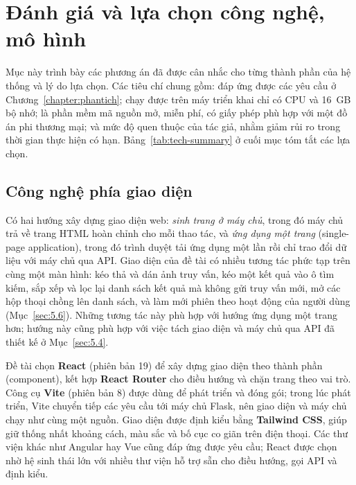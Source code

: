 \section{Đánh giá và lựa chọn công nghệ, mô hình}
\label{sec:6.1}

Mục này trình bày các phương án đã được cân nhắc cho từng thành phần của hệ thống và lý do lựa chọn. Các tiêu chí chung gồm: đáp ứng được các yêu cầu ở Chương~\ref{chapter:phantich}; chạy được trên máy triển khai chỉ có CPU và 16~GB bộ nhớ; là phần mềm mã nguồn mở, miễn phí, có giấy phép phù hợp với một đồ án phi thương mại; và mức độ quen thuộc của tác giả, nhằm giảm rủi ro trong thời gian thực hiện có hạn. Bảng~\ref{tab:tech-summary} ở cuối mục tóm tắt các lựa chọn.

\subsection{Công nghệ phía giao diện}
\label{sec:6.1.1}

Có hai hướng xây dựng giao diện web: \emph{sinh trang ở máy chủ}, trong đó máy chủ trả về trang HTML hoàn chỉnh cho mỗi thao tác, và \emph{ứng dụng một trang} (single-page application), trong đó trình duyệt tải ứng dụng một lần rồi chỉ trao đổi dữ liệu với máy chủ qua API. Giao diện của đề tài có nhiều tương tác phức tạp trên cùng một màn hình: kéo thả và dán ảnh truy vấn, kéo một kết quả vào ô tìm kiếm, sắp xếp và lọc lại danh sách kết quả mà không gửi truy vấn mới, mở các hộp thoại chồng lên danh sách, và làm mới phiên theo hoạt động của người dùng (Mục~\ref{sec:5.6}). Những tương tác này phù hợp với hướng ứng dụng một trang hơn; hướng này cũng phù hợp với việc tách giao diện và máy chủ qua API đã thiết kế ở Mục~\ref{sec:5.4}.

Đề tài chọn \textbf{React} (phiên bản 19) để xây dựng giao diện theo thành phần (component), kết hợp \textbf{React Router} cho điều hướng và chặn trang theo vai trò. Công cụ \textbf{Vite} (phiên bản 8) được dùng để phát triển và đóng gói; trong lúc phát triển, Vite chuyển tiếp các yêu cầu  tới máy chủ Flask, nên giao diện và máy chủ chạy như cùng một nguồn. Giao diện được định kiểu bằng \textbf{Tailwind CSS}, giúp giữ thống nhất khoảng cách, màu sắc và bố cục co giãn trên điện thoại. Các thư viện khác như Angular hay Vue cũng đáp ứng được yêu cầu; React được chọn nhờ hệ sinh thái lớn với nhiều thư viện hỗ trợ sẵn cho điều hướng, gọi API và định kiểu.

